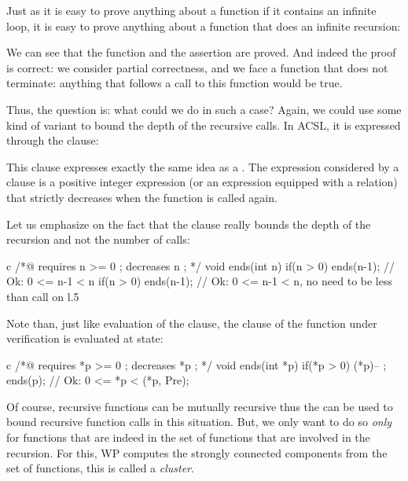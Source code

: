 Just as it is easy to prove anything about a function if it contains an
infinite loop, it is easy to prove anything about a function that does an
infinite recursion:






We can see that the function and the assertion are proved. And indeed the
proof is correct: we consider partial correctness, and we face a function
that does not terminate: anything that follows a call to this function would
be true.


Thus, the question is: what could we do in such a case? Again, we could use
some kind of variant to bound the depth of the recursive calls. In ACSL, it is
expressed through the  clause:





This clause expresses exactly the same idea as a .
The expression considered by a  clause is a positive
integer expression (or an expression equipped with a relation) that strictly
decreases when the function is called again.



Let us emphasize on the fact that the  clause really
bounds the depth of the recursion and not the number of calls:



\begin{CodeBlock}{c}
/*@ requires n >= 0 ;
    decreases n ;
*/
void ends(int n){
  if(n > 0) ends(n-1); // Ok: 0 <= n-1 < n
  if(n > 0) ends(n-1); // Ok: 0 <= n-1 < n, no need to be less than call on l.5
}
\end{CodeBlock}



Note than, just like evaluation of the  clause, the
clause of the function under verification is evaluated at 
state:


\begin{CodeBlock}{c}
/*@ requires *p >= 0 ;
    decreases *p ;
*/
void ends(int *p){
  if(*p > 0){
    (*p)-- ;
    ends(p); // Ok: 0 <= *p < \at(*p, Pre);
  }
}
\end{CodeBlock}



Of course, recursive functions can be mutually recursive thus the
 can be used to bound recursive function calls in this
situation. But, we only want to do so {\em only} for functions that are indeed
in the set of functions that are involved in the recursion. For this, WP
computes the strongly connected components from the set of functions, this is
called a {\em cluster}.


